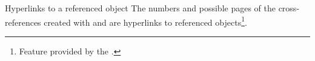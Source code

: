 \documentclass[english,nolocaltoc]{nwejmart}
\newtheorem[style=definition]{fact}
\newtheorem[title=experience]{experience}
\newtheorem[title-plural=rings]{ring}
\newtheorem[title=ideal,title-plural=ideals]{ideal}
\begin{document}
\begin{dbremark}{Hyperlinks to a referenced object}{}
  The numbers and  possible  pages of the
  cross-references created with  and 
 are hyperlinks to referenced objects\footnote{Feature provided by the .}.
\end{dbremark}


%
%
\end{document}
